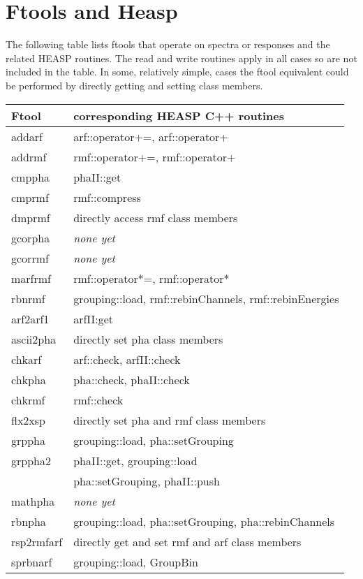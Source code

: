 \documentclass[11pt]{book}
\begin{document}
\appendix


\chapter{Ftools and Heasp}

The following table lists ftools that operate on spectra or responses
and the related HEASP routines. The read and write routines apply in
all cases so are not included in the table. In some, relatively
simple, cases the ftool equivalent could be performed by directly
getting and setting class members. 

\begin{table}
  \begin{tabular}{ll}
    \hline\hline
    {Ftool} & {corresponding HEASP C++ routines} \\
    \hline
    addarf      & arf::operator+=, arf::operator+  \\
    addrmf      & rmf::operator+=, rmf::operator+  \\
    cmppha      & phaII::get \\
    cmprmf      & rmf::compress \\
    dmprmf      & directly access rmf class members \\
    gcorpha     & {\it none yet} \\
    gcorrmf     & {\it none yet} \\
    marfrmf     & rmf::operator*=, rmf::operator* \\
    rbnrmf      & grouping::load, rmf::rebinChannels, rmf::rebinEnergies \\
    arf2arf1    & arfII:get \\
    ascii2pha   & directly set pha class members \\
    chkarf      & arf::check, arfII::check \\
    chkpha      & pha::check, phaII::check \\
    chkrmf      & rmf::check \\
    flx2xsp     & directly set pha and rmf class members \\
    grppha      & grouping::load, pha::setGrouping \\
    grppha2     & phaII::get, grouping::load \\
                & pha::setGrouping, phaII::push \\
    mathpha     & {\it none yet} \\
    rbnpha      & grouping::load, pha::setGrouping, pha::rebinChannels \\
    rsp2rmfarf  & directly get and set rmf and arf class members \\
    sprbnarf    & grouping::load, GroupBin \\
    \hline
  \end{tabular}
\end{table}
\end{document}
